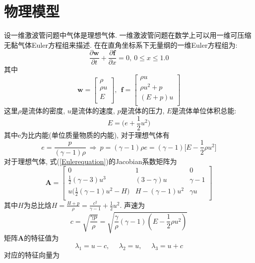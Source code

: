 \documentclass[a4paper,boxed]{caspset}
\begin{document}
\section{物理模型}
设一维激波管问题中气体是理想气体. 一维激波管问题在数学上可以用一维可压缩无黏气体Euler方程组来描述. 在在直角坐标系下无量纲的一维Euler方程组为:
\begin{equation}\label{Eulerequation}
\frac{\partial \mathbf{w}}{\partial t}+\frac{\partial \mathbf{f}}{\partial x} = 0,\: 0\leq x\leq 1.0
\end{equation}
其中
\[
\mathbf{w} = \left[
  \begin{array}{c}
    \rho \\
    \rho u \\
    E \\
  \end{array}
\right],\:\:
\mathbf{f} = \left[
  \begin{array}{c}
    \rho u \\
    \rho u^2 + p \\
    (E+p)u \\
  \end{array}
\right]
\]
这里$\rho$是流体的密度, $u$是流体的速度, $p$是流体的压力, $E$是流体单位体积总能:
\[
E = \bigg(e+\frac{1}{2}u^2\bigg)
\]
其中e为比内能(单位质量物质的内能), 对于理想气体有
\[
e=\frac{p}{(\gamma -1)\rho}\:\Longrightarrow\:p=(\gamma-1)\rho e=(\gamma-1)\Big[E-\frac{1}{2}\rho u^2\Big]
\]
对于理想气体, 式(\ref{Eulerequation})的Jacobian系数矩阵为
\[
\mathbf{A} = \left[
      \begin{array}{ccc}
        0 & 1 & 0 \\
        \frac{1}{2}(\gamma-3)u^3 & (3-\gamma)u & \gamma-1 \\
        u\big(\frac{1}{2}(\gamma-1)u^2-H\big) & H-(\gamma-1)u^2 & \gamma u \\
      \end{array}
    \right]
\]
其中$H$为总比焓$H=\frac{H+p}{\rho}=\frac{c^2}{\gamma-1}+\frac{1}{2}u^2$. 声速为
\[
c=\sqrt{\frac{\gamma p}{\rho}}=\sqrt{\frac{\gamma}{\rho}(\gamma-1)(E-\frac{1}{2}\rho u^2)}
\]
矩阵$\mathbf{A}$的特征值为
\[
\lambda_1 = u - c, \: \: \: \: \: \: \lambda_2 = u, \: \: \: \: \: \:\lambda_3 = u + c
\]
对应的特征向量为
\end{document}
